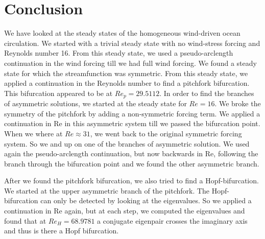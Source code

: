 \section{Conclusion}
We have looked at the steady states of the homogeneous wind-driven ocean circulation. We started with a trivial steady state with no wind-stress forcing and Reynolds number 16. From this steady state, we used a pseudo-arclength continuation in the wind forcing till we had full wind forcing. We found a steady state for which the streamfunction was symmetric. From this steady state, we applied a continuation in the Reynolds number to find a pitchfork bifurcation. This bifurcation appeared to be at $Re_p=29.5112$. In order to find the branches of asymmetric solutions, we started at the steady state for $Re=16$. We broke the symmetry of the pitchfork by adding a non-symmetric forcing term. We applied a continuation in Re in this asymmetric system till we passed the bifurcation point. When we where at $Re\approx 31$, we went back to the original symmetric forcing system. So we and up on one of the branches of asymmetric solution. We used again the pseudo-arclength continuation, but now backwards in Re, following the branch through the bifurcation point and we found the other asymmetric branch.

After we found the pitchfork bifurcation, we also tried to find a Hopf-bifurcation. We started at the upper asymmetric branch of the pitchfork. The Hopf-bifurcation can only be detected by looking at the eigenvalues. So we applied a continuation in Re again, but at each step, we computed the eigenvalues and found that at $Re_H=68.9781$ a conjugate eigenpair crosses the imaginary axis and thus is there a Hopf bifurcation.